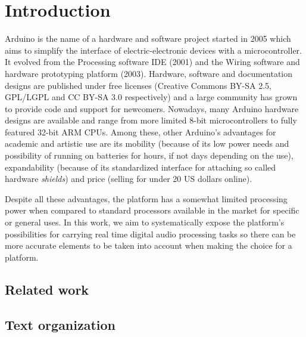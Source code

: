 
\section{Introduction}


Arduino is the name of a hardware and software project started in 2005 which
aims to simplify the interface of electric-electronic devices with a
microcontroller. It evolved from the Processing software IDE (2001) and the
Wiring software and hardware prototyping platform (2003). Hardware, software
and documentation designs are published under free licenses (Creative Commons
BY-SA 2.5, GPL/LGPL and CC BY-SA 3.0 respectively) and a large community has
grown to provide code and support for newcomers. Nowadays, many Arduino
hardware designs are available and range from more limited 8-bit
microcontrollers to fully featured 32-bit ARM CPUs. Among these, other
Arduino's advantages for academic and artistic use are its mobility (because
of its low power needs and possibility of running on batteries for hours, if
not days depending on the use), expandability (because of its standardized
interface for attaching so called hardware \emph{shields}) and price (selling
for under 20 US dollars online).

Despite all these advantages, the platform has a somewhat limited processing
power when compared to standard processors available in the market for
specific or general uses. In this work, we aim to systematically expose the
platform's possibilities for carrying real time digital audio processing tasks
so there can be more accurate elements to be taken into account when making
the choice for a platform.


\subsection{Related work}




\subsection{Text organization}

